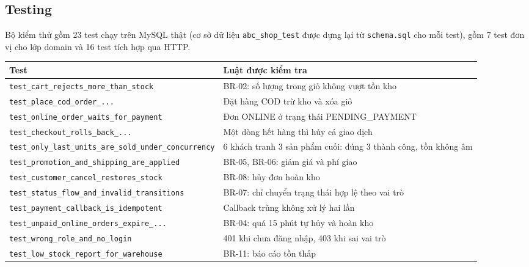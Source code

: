 \documentclass[12pt,a4paper,oneside]{report}
\begin{document}
\subsection{Testing}
Bộ kiểm thử gồm 23 test chạy trên MySQL thật (cơ sở dữ liệu \texttt{abc\_shop\_test} được dựng lại từ \texttt{schema.sql} cho mỗi test), gồm 7 test đơn vị cho lớp domain và 16 test tích hợp qua HTTP.
\begin{longtable}{@{}p{6.6cm}p{8.6cm}@{}}\toprule \textbf{Test} & \textbf{Luật được kiểm tra}\\\midrule\endhead
\texttt{test\_cart\_rejects\_more\_than\_stock} & BR-02: số lượng trong giỏ không vượt tồn kho\\\midrule
\texttt{test\_place\_cod\_order\_...} & Đặt hàng COD trừ kho và xóa giỏ\\\midrule
\texttt{test\_online\_order\_waits\_for\_payment} & Đơn ONLINE ở trạng thái PENDING\_PAYMENT\\\midrule
\texttt{test\_checkout\_rolls\_back\_...} & Một dòng hết hàng thì hủy cả giao dịch\\\midrule
\texttt{test\_only\_last\_units\_are\_sold\_under\_concurrency} & 6 khách tranh 3 sản phẩm cuối: đúng 3 thành công, tồn không âm\\\midrule
\texttt{test\_promotion\_and\_shipping\_are\_applied} & BR-05, BR-06: giảm giá và phí giao\\\midrule
\texttt{test\_customer\_cancel\_restores\_stock} & BR-08: hủy đơn hoàn kho\\\midrule
\texttt{test\_status\_flow\_and\_invalid\_transitions} & BR-07: chỉ chuyển trạng thái hợp lệ theo vai trò\\\midrule
\texttt{test\_payment\_callback\_is\_idempotent} & Callback trùng không xử lý hai lần\\\midrule
\texttt{test\_unpaid\_online\_orders\_expire\_...} & BR-04: quá 15 phút tự hủy và hoàn kho\\\midrule
\texttt{test\_wrong\_role\_and\_no\_login} & 401 khi chưa đăng nhập, 403 khi sai vai trò\\\midrule
\texttt{test\_low\_stock\_report\_for\_warehouse} & BR-11: báo cáo tồn thấp\\\midrule
\bottomrule\end{longtable}
\end{document}

